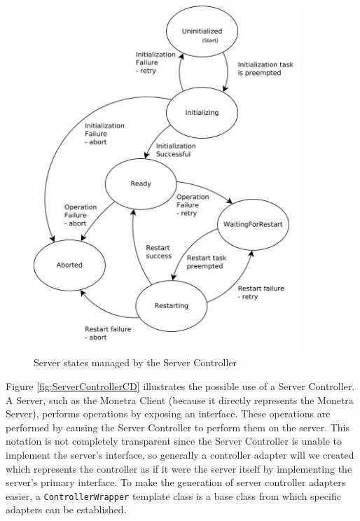 \documentclass[a4paper,oneside,10pt]{report}
\begin{document}
\begin{figure}
	\centering
		\includegraphics[width=0.9\textwidth]{ServerControllerState.pdf}
	\caption{Server states managed by the Server Controller}
	\label{fig:ServerControllerState}
\end{figure}

Figure \ref{fig:ServerControllerCD} illustrates the possible use of a Server Controller. A Server, such as the Monetra Client (because it directly represents the Monetra Server), performs operations by exposing an interface. These operations are performed by causing the Server Controller to perform them on the server. This notation is not completely transparent since the Server Controller is unable to implement the server's interface, so generally a controller adapter will we created which represents the controller as if it were the server itself by implementing the server's primary interface. To make the generation of server controller adapters easier, a \texttt{ControllerWrapper} template class is a base class from which specific adapters can be established. 
\end{document}

